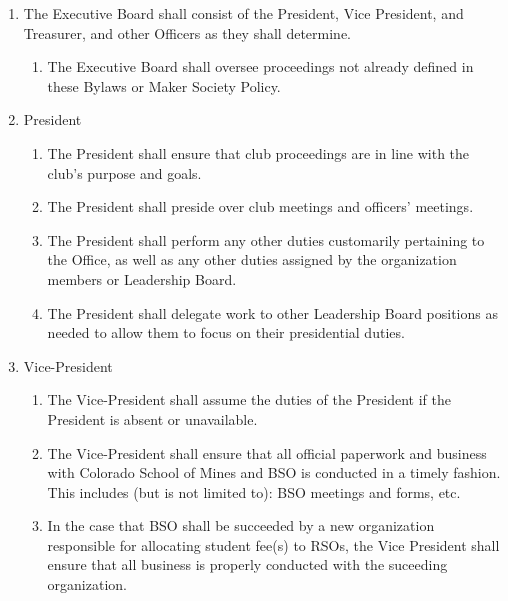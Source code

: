 \documentclass[12pt,letterpaper]{article}
\begin{document}
\begin{enumerate}[label=\Alph*.]
    \item The Executive Board shall consist of the President, Vice President, and Treasurer, and other Officers as they shall determine.
    \begin{enumerate}[label=\arabic*)]
        \item The Executive Board shall oversee proceedings not already defined in these Bylaws or Maker Society Policy. 
    \end{enumerate}
    
    \item President
    \begin{enumerate}[label=\arabic*)]
        \item The President shall ensure that club proceedings are in line with the club’s purpose and goals.
        \item The President shall preside over club meetings and officers’ meetings.
        \item The President shall perform any other duties customarily pertaining to the Office, as well as any other duties assigned by the organization members or Leadership Board.
        \item The President shall delegate work to other Leadership Board positions as needed to allow them to focus on their presidential duties.
    \end{enumerate}
    
    \item Vice-President
    \begin{enumerate}[label=\arabic*)]
        \item The Vice-President shall assume the duties of the President if the President is absent or unavailable.
        \item The Vice-President shall ensure that all official paperwork and business with Colorado School of Mines and BSO is conducted in a timely fashion. This includes (but is not limited to): BSO meetings and forms, etc. 
        \item In the case that BSO shall be succeeded by a new organization responsible for allocating student fee(s) to RSOs, the Vice President shall ensure that all business is properly conducted with the suceeding organization.
    \end{enumerate}


\end{enumerate}
\end{document}

